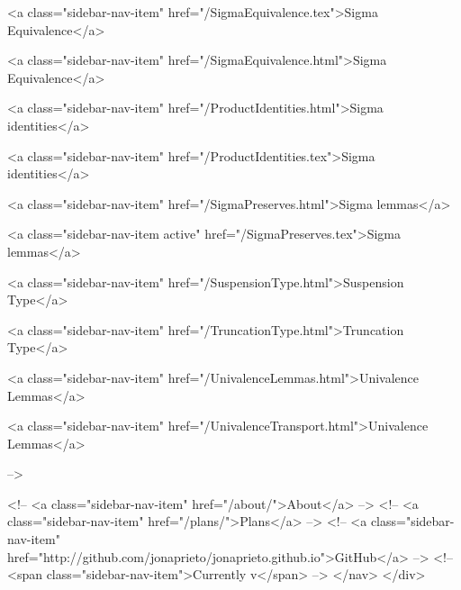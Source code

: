      
    
      
        
          <a class="sidebar-nav-item" href="/SigmaEquivalence.tex">Sigma Equivalence</a>
        
      
    
      
        
          <a class="sidebar-nav-item" href="/SigmaEquivalence.html">Sigma Equivalence</a>
        
      
    
      
        
          <a class="sidebar-nav-item" href="/ProductIdentities.html">Sigma identities</a>
        
      
    
      
        
          <a class="sidebar-nav-item" href="/ProductIdentities.tex">Sigma identities</a>
        
      
    
      
        
          <a class="sidebar-nav-item" href="/SigmaPreserves.html">Sigma lemmas</a>
        
      
    
      
        
          <a class="sidebar-nav-item active" href="/SigmaPreserves.tex">Sigma lemmas</a>
        
      
    
      
        
          <a class="sidebar-nav-item" href="/SuspensionType.html">Suspension Type</a>
        
      
    
      
        
          <a class="sidebar-nav-item" href="/TruncationType.html">Truncation Type</a>
        
      
    
      
        
          <a class="sidebar-nav-item" href="/UnivalenceLemmas.html">Univalence Lemmas</a>
        
      
    
      
        
          <a class="sidebar-nav-item" href="/UnivalenceTransport.html">Univalence Lemmas</a>
        
      
     -->

    <!-- <a class="sidebar-nav-item" href="/about/">About</a> -->
    <!-- <a class="sidebar-nav-item" href="/plans/">Plans</a> -->
    <!-- <a class="sidebar-nav-item" href="http://github.com/jonaprieto/jonaprieto.github.io">GitHub</a> -->
    <!-- <span class="sidebar-nav-item">Currently v</span> -->
  </nav>
</div>

